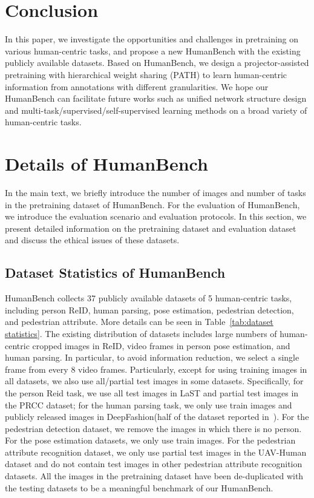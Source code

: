 \documentclass[10pt,twocolumn,letterpaper]{article}
\begin{document}
\section{Conclusion}
In this paper, we investigate the opportunities and challenges in pretraining on various human-centric tasks, and propose a new HumanBench with the existing publicly available datasets. Based on HumanBench, we design a projector-assisted pretraining with hierarchical weight sharing (PATH) to learn human-centric information from annotations with different granularities. We hope our HumanBench can facilitate future works such as unified network structure design and multi-task/supervised/self-supervised learning methods on a broad variety of human-centric tasks.

{\small


}

\clearpage
\appendix

\section{Details of HumanBench}
In the main text, we briefly introduce the number of images and number of tasks in the pretraining dataset of HumanBench. For the evaluation of HumanBench, we introduce the evaluation scenario and evaluation protocols. In this section, we present detailed information on the pretraining dataset and evaluation dataset and discuss the ethical issues of these datasets.
\subsection{Dataset Statistics of HumanBench}
HumanBench collects 37 publicly available datasets of 5 human-centric tasks, including person ReID, human parsing, pose estimation, pedestrian detection, and pedestrian attribute. More details can be seen in Table~\ref{tab:dataset statistics}.  The existing distribution of datasets includes large numbers of human-centric cropped images in ReID, video frames in person pose estimation, and human parsing. In particular, to avoid information reduction, we select a single frame from every 8 video frames. Particularly, except for using training images in all datasets, we also use all/partial test images in some datasets. Specifically, for the person Reid task, we use all test images in LaST and partial test images in the PRCC dataset; for the human parsing task, we only use train images and publicly released images in DeepFashion(half of the dataset reported in~\cite{liu2016deepfashion}). For the pedestrian detection dataset, we remove the images in which there is no person. For the pose estimation datasets, we only use train images. For the pedestrian attribute recognition dataset, we only use partial test images in the UAV-Human dataset and do not contain test images in other pedestrian attribute recognition datasets. All the images in the pretraining dataset have been de-duplicated with the testing datasets to be a meaningful benchmark of our HumanBench.
\end{document}
